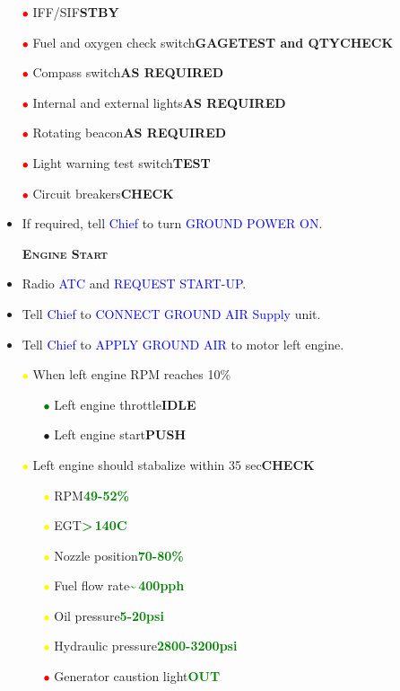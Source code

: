 \documentclass[a4paper,12pt,dvipsnames]{letter}
\newcommand{\radio}[1]{\textcolor{blue}{#1}}
\newcommand{\button}[1]{\textbf{#1}}
\newcommand{\degC}{\textdegree{}C}
\newcommand{\ok}[1]{\textcolor{Green}{\textbf{#1}}}
\newcommand{\myHead}[1]{{\LARGE\textsc{\textbf{#1}}}}
\newcommand{\bi}{\textcolor{ProcessBlue}{$\bullet$\;}}
\newcommand{\ri}{\textcolor{Red}{$\bullet$\;}}
\newcommand{\gi}{\textcolor{Green}{$\bullet$\;}}
\newcommand{\yi}{\textcolor{Yellow}{$\bullet$\;}}
\begin{document}
{\begin{itemize}
 \item[\ri] IFF/SIF\dotfill\button{STBY}
 \item[\ri] Fuel and oxygen check switch\dotfill\button{GAGE\;TEST and QTY\;CHECK}
 \item[\ri] Compass switch\dotfill\button{AS REQUIRED}
 \item[\ri] Internal and external lights\dotfill\button{AS REQUIRED}
 \item[\ri] Rotating beacon\dotfill\button{AS REQUIRED}
 \item[\ri] Light warning test switch\dotfill\button{TEST}
 \item[\ri] Circuit breakers\dotfill\button{CHECK}
 \item If required, tell \radio{Chief} to turn \radio{GROUND POWER ON}.
\end{itemize}
\newpage
\begin{itemize}
 \item[] \myHead{Engine Start}
 \item Radio \radio{ATC} and \radio{REQUEST START-UP}.
 \item Tell \radio{Chief} to \radio{CONNECT GROUND AIR Supply} unit.
 \item Tell \radio{Chief} to \radio{APPLY GROUND AIR} to motor left engine.
 \item[\yi] When left engine RPM reaches 10\;\%
 \begin{itemize}
  \item[\gi] Left engine throttle\dotfill\button{IDLE}
  \item[\bi] Left engine start\dotfill\button{PUSH}
 \end{itemize}
 \item[\yi] Left engine should stabalize within 35 sec\dotfill\button{CHECK}
  \begin{itemize}
  \item[\yi] RPM\dotfill\ok{49-52\;\%}
  \item[\yi] EGT\dotfill\ok{>\,140\;\degC}
  \item[\yi] Nozzle position\dotfill\ok{70-80\;\%}
  \item[\yi] Fuel flow rate\dotfill\ok{\textasciitilde\,400\;pph}
  \item[\yi] Oil pressure\dotfill\ok{5-20\;psi}
  \item[\yi] Hydraulic pressure\dotfill\ok{2800-3200\;psi}
  \item[\ri] Generator caustion light\dotfill\ok{OUT}

\end{itemize}
\end{itemize}}
\end{document}
